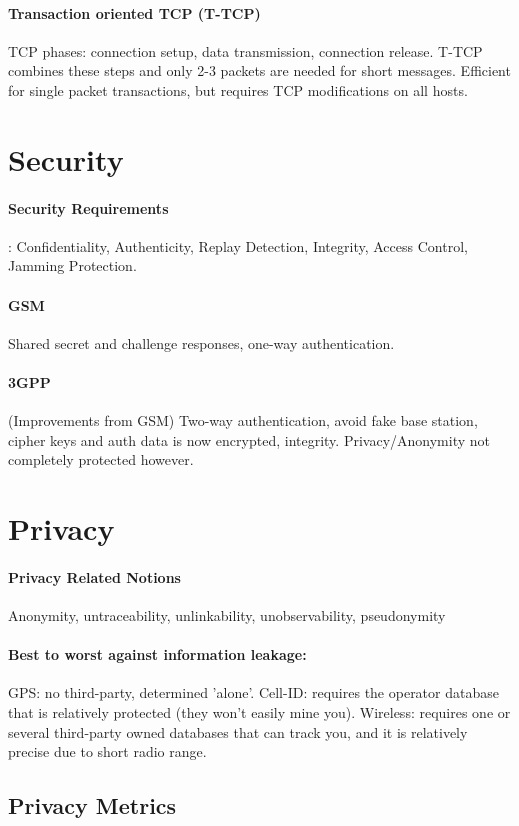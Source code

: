 \documentclass[6pt]{scrartcl}
\begin{document}
\begin{multicols}{4}
\paragraph{Transaction oriented TCP (T-TCP)} TCP phases: connection setup, data transmission, connection release. T-TCP combines these steps and only 2-3 packets are needed for short messages. Efficient for single packet transactions, but requires TCP modifications on all hosts.

\section{Security}
\paragraph{Security Requirements}: Confidentiality, Authenticity, Replay Detection, Integrity, Access Control, Jamming Protection.
\paragraph{GSM} Shared secret and challenge responses, one-way authentication.
\paragraph{3GPP} (Improvements from GSM) Two-way authentication, avoid fake base station, cipher keys and auth data is now encrypted, integrity. Privacy/Anonymity not completely protected however.

\section{Privacy}
\paragraph{Privacy Related Notions}Anonymity, untraceability, unlinkability, unobservability, pseudonymity
\paragraph{Best to worst against information leakage:}
GPS: no third-party, determined 'alone'.
Cell-ID: requires the operator database that is relatively protected (they won't easily mine you).
Wireless: requires one or several third-party owned databases that can track you, and it is relatively precise due to short radio range.

\subsection{Privacy Metrics}


\end{multicols}
\end{document}
